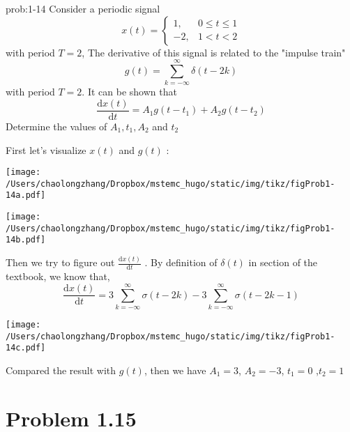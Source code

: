 \documentclass[koma,a4paper,utopia,12pt,listings-color,microtype,paralist,colorlinks,urlcolor=red]{org-article}
\begin{document}
\begin{prob}[]{prob:1-14}
Consider a periodic signal
\begin{equation*}
x(t) =
\begin{cases}
1, & 0\leq t\leq 1 \\
-2, & 1 < t <2
\end{cases}
\end{equation*}
with period \(T=2\), The derivative of this signal is related to the
"impulse train"
\begin{equation*}
g(t) = \sum_{k=-\infty}^{\infty} \delta(t-2k)
\end{equation*}
with period \(T=2\). It can be shown that
\begin{equation*}
\frac{\mathrm{d}x(t)}{\mathrm{d}t} = A_{1}g(t-t_{1}) + A_{2} g(t-t_{2})
\end{equation*}
Determine the values of \(A_{1},t_{1},A_{2}\) and \(t_{2}\)
\label{prob:1-14}
\end{prob}

First let's visualize \(x(t)\) and \(g(t)\) :

\begin{center}
\texttt{[image: /Users/chaolongzhang/Dropbox/mstemc\_hugo/static/img/tikz/figProb1-14a.pdf]}
\end{center}

\begin{center}
\texttt{[image: /Users/chaolongzhang/Dropbox/mstemc\_hugo/static/img/tikz/figProb1-14b.pdf]}
\end{center}

Then we try to figure out \(\frac{\mathrm{d}x(t)}{\mathrm{d}t}\) . By definition
of \(\delta (t)\) in section of the textbook, we know that,
\begin{equation*}
\frac{\mathrm{d}x(t)}{\mathrm{d}t} = 3\sum_{k=-\infty}^{\infty} \sigma(t-2k )  -3 \sum_{k=-\infty}^{\infty} \sigma(t-2k -1)
\end{equation*}

\begin{center}
\texttt{[image: /Users/chaolongzhang/Dropbox/mstemc\_hugo/static/img/tikz/figProb1-14c.pdf]}
\end{center}


Compared the result with \(g(t)\), then we have \(A_{1} = 3\), \(A_{2} = -3\),
\(t_{1} = 0\) ,\(t_{2} = 1\)

\section{Problem 1.15}
\label{sec:org9bba923}
\end{document}
